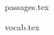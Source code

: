\documentclass[a4paper,12pt, openany]{exam}
\begin{document}

     {passages.tex} \newpage

     {vocab.tex} \newpage
\end{document}
